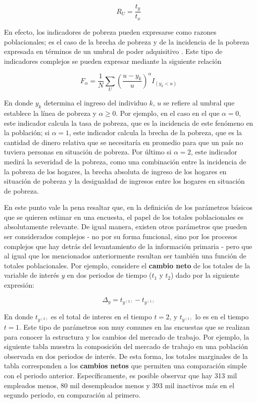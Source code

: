 \documentclass[
  12pt,
  spanish,
]{book}
\begin{document}
\[R_U=\frac{t_y}{t_x}\]

En efecto, los indicadores de pobreza pueden expresarse como razones poblacionales; es el caso de la brecha de pobreza y de la incidencia de la pobreza expresada en términos de un umbral de poder adquisitivo \citep{Foster_Greer_Thorbecke_1984}. Este tipo de indicadores complejos se pueden expresar mediante la siguiente relación

\[
F_{\alpha} = \frac{1}{N} \sum_U \left(\frac{u-y_k}{u}\right)^{\alpha}I_{(y_k < u)}
\]

En donde \(y_k\) determina el ingreso del individuo \(k\), \(u\) se refiere al umbral que establece la línea de pobreza y \(\alpha \geq 0\). Por ejemplo, en el caso en el que \(\alpha = 0\), este indicador calcula la tasa de pobreza, que es la incidencia de este fenómeno en la población; si \(\alpha = 1\), este indicador calcula la brecha de la pobreza, que es la cantidad de dinero relativa que se necesitaría en promedio para que un país no tuviera personas en situación de pobreza. Por último si \(\alpha = 2\), este indicador medirá la severidad de la pobreza, como una combinación entre la incidencia de la pobreza de los hogares, la brecha absoluta de ingreso de los hogares en situación de pobreza y la desigualdad de ingresos entre los hogares en situación de pobreza.

En este punto vale la pena resaltar que, en la definición de los parámetros básicos que se quieren estimar en una encuesta, el papel de los totales poblacionales es absolutamente relevante. De igual manera, existen otros parámetros que pueden ser considerados complejos - no por su forma funcional, sino por los procesos complejos que hay detrás del levantamiento de la información primaria - pero que al igual que los mencionados anteriormente resultan ser también una función de totales poblacionales. Por ejemplo, considere el \textbf{cambio neto} de los totales de la variable de interés \(y\) en dos periodos de tiempo (\(t_1\) y \(t_2\)) dado por la siguiente expresión:

\[
\Delta_y = t_{y^{(2)}} - t_{y^{(1)}}
\]

En donde \(t_{y^{(2)}}\) es el total de interes en el tiempo \(t = 2\), y \(t_{y^{(1)}}\) lo es en el tiempo \(t=1\). Este tipo de parámetros son muy comunes en las encuestas que se realizan para conocer la estructura y los cambios del mercado de trabajo. Por ejemplo, la siguiente tabla muestra la composición del mercado de trabajo en una población observada en dos periodos de interés. De esta forma, los totales marginales de la tabla corresponden a los \textbf{cambios netos} que permiten una comparación simple con el periodo anterior. Específicamente, es posible observar que hay 313 mil empleados menos, 80 mil desempleados menos y 393 mil inactivos más en el segundo periodo, en comparación al primero.
\end{document}
